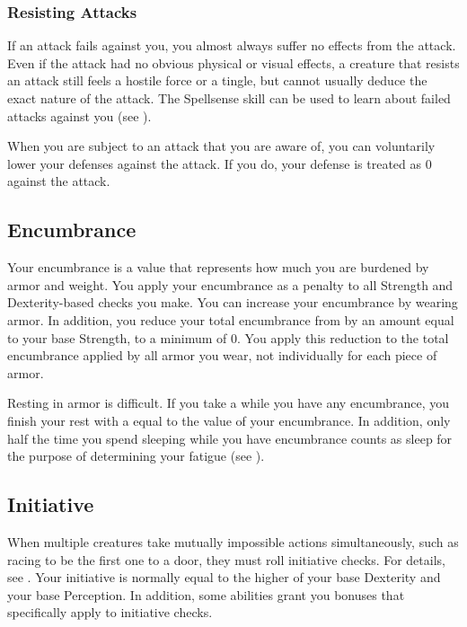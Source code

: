         \subsubsection{Resisting Attacks}
            If an attack fails against you, you almost always suffer no effects from the attack.
            Even if the attack had no obvious physical or visual effects, a creature that resists an attack still feels a hostile force or a tingle, but cannot usually deduce the exact nature of the attack.
            The Spellsense skill can be used to learn about failed  attacks against you (see ).

             When you are subject to an attack that you are aware of, you can voluntarily lower your defenses against the attack.
            If you do, your defense is treated as 0 against the attack.

    \subsection{Encumbrance}\label{Encumbrance}
        Your encumbrance is a value that represents how much you are burdened by armor and weight.
        You apply your encumbrance as a penalty to all Strength and Dexterity-based checks you make.
        You can increase your encumbrance by wearing armor.
        In addition, you reduce your total encumbrance from  by an amount equal to your base Strength, to a minimum of 0.
        You apply this reduction to the total encumbrance applied by all armor you wear, not individually for each piece of armor.

        Resting in armor is difficult.
        If you take a  while you have any encumbrance, you finish your rest with a  equal to the value of your encumbrance.
        In addition, only half the time you spend sleeping while you have encumbrance counts as sleep for the purpose of determining your fatigue (see ).

    \subsection{Initiative}\label{Initiative}
        When multiple creatures take mutually impossible actions simultaneously, such as racing to be the first one to a door, they must roll initiative checks.
        For details, see .
        Your initiative is normally equal to the higher of your base Dexterity and your base Perception.
        In addition, some abilities grant you bonuses that specifically apply to initiative checks.

